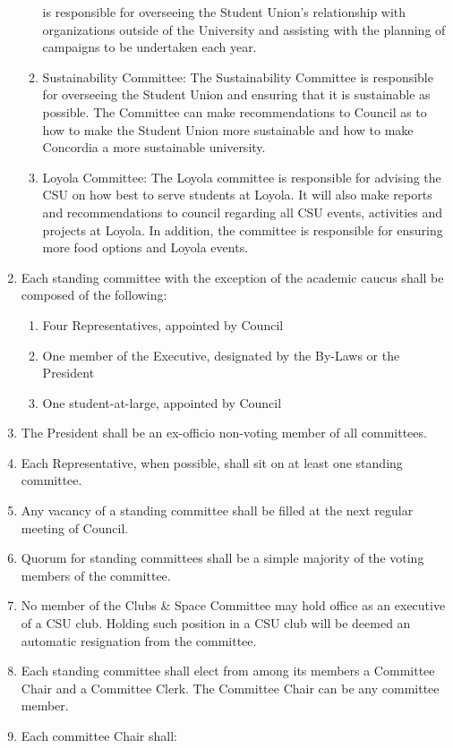 \documentclass[oneside]{book}
\begin{document}
\begin{enumerate}
\begin{enumerate}
is responsible for overseeing the Student Union's relationship with
organizations outside of the University and assisting with the planning
of campaigns to be undertaken each year. 
\item Sustainability Committee: The Sustainability Committee is responsible
for overseeing the Student Union and ensuring that it is sustainable
as possible. The Committee can make recommendations to Council as
to how to make the Student Union more sustainable and how to make
Concordia a more sustainable university. 
\item Loyola Committee: The Loyola committee is responsible for advising
the CSU on how best to serve students at Loyola. It will also make
reports and recommendations to council regarding all CSU events, activities
and projects at Loyola. In addition, the committee is responsible
for ensuring more food options and Loyola events. 
\end{enumerate}
\item Each standing committee with the exception of the academic caucus
shall be composed of the following: 

\begin{enumerate}
\item Four Representatives, appointed by Council 
\item One member of the Executive, designated by the By-Laws or the President 
\item One student-at-large, appointed by Council 
\end{enumerate}
\item The President shall be an ex-officio non-voting member of all committees. 
\item Each Representative, when possible, shall sit on at least one standing
committee. 
\item \label{committee-vacancy} Any vacancy of a standing committee shall be filled at the next regular
meeting of Council. 
\item Quorum for standing committees shall be a simple majority of the voting
members of the committee. 
\item No member of the Clubs \& Space Committee may hold office as an executive 
of a CSU club. Holding such position in a CSU club will be deemed an automatic resignation
from the committee. 
\item Each standing committee shall elect from among its members a Committee
Chair and a Committee Clerk. The Committee Chair can be any committee
member. 
\item \label{committee-chair-responsibilities} Each committee Chair shall: 


\end{enumerate}
\end{document}
